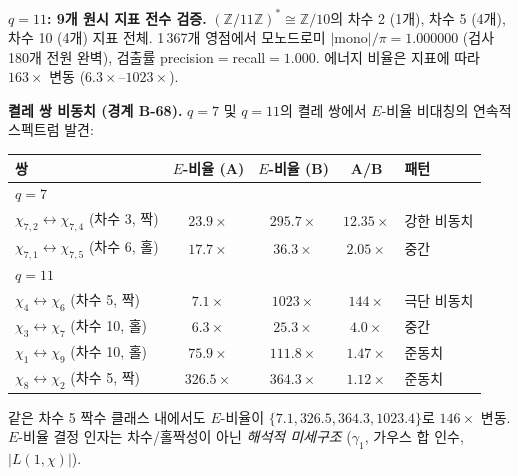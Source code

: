 \documentclass[11pt, a4paper]{article}
\theoremstyle{definition}
\theoremstyle{plain}
\begin{document}
\smallskip\noindent
\textbf{$q = 11$: 9개 원시 지표 전수 검증.}
$(\mathbb{Z}/11\mathbb{Z})^*\cong\mathbb{Z}/10$의 차수 2 (1개), 차수 5 (4개), 차수 10 (4개) 지표 전체.
1\,367개 영점에서 모노드로미 $|\mathrm{mono}|/\pi = 1.000000$ (검사 180개 전원 완벽),
검출률 precision${=}$recall${=}1.000$.
에너지 비율은 지표에 따라 $163\times$ 변동 ($6.3\times$--$1023\times$).

\smallskip\noindent
\textbf{켤레 쌍 비동치 (경계 B-68).}
$q{=}7$ 및 $q{=}11$의 켤레 쌍에서 $E$-비율 비대칭의 연속적 스펙트럼 발견:

\begin{center}
\small
\begin{tabular}{lcccl}
\toprule
쌍 & $E$-비율 (A) & $E$-비율 (B) & A/B & 패턴 \\
\midrule
\multicolumn{5}{l}{\textit{$q=7$}} \\
$\chi_{7,2} \leftrightarrow \chi_{7,4}$ (차수 3, 짝) & $23.9\times$ & $295.7\times$ & $12.35\times$ & 강한 비동치 \\
$\chi_{7,1} \leftrightarrow \chi_{7,5}$ (차수 6, 홀) & $17.7\times$ & $36.3\times$ & $2.05\times$ & 중간 \\
\midrule
\multicolumn{5}{l}{\textit{$q=11$}} \\
$\chi_4 \leftrightarrow \chi_6$ (차수 5, 짝) & $7.1\times$ & $1023\times$ & $144\times$ & 극단 비동치 \\
$\chi_3 \leftrightarrow \chi_7$ (차수 10, 홀) & $6.3\times$ & $25.3\times$ & $4.0\times$ & 중간 \\
$\chi_1 \leftrightarrow \chi_9$ (차수 10, 홀) & $75.9\times$ & $111.8\times$ & $1.47\times$ & 준동치 \\
$\chi_8 \leftrightarrow \chi_2$ (차수 5, 짝) & $326.5\times$ & $364.3\times$ & $1.12\times$ & 준동치 \\
\bottomrule
\end{tabular}
\end{center}

\noindent
같은 차수 5 짝수 클래스 내에서도 $E$-비율이 $\{7.1, 326.5, 364.3, 1023.4\}$로
$146\times$ 변동. $E$-비율 결정 인자는 차수/홀짝성이 아닌
\emph{해석적 미세구조} ($\gamma_1$, 가우스 합 인수, $|L(1,\chi)|$).
\end{document}
